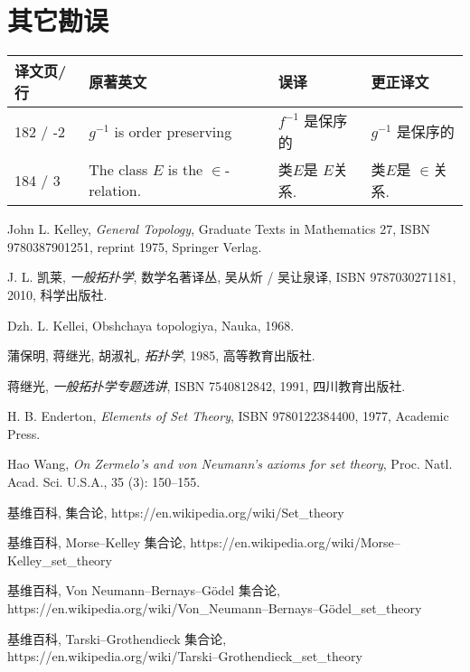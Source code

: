 \documentclass[zihao=-4,a4paper]{ctexart}
\begin{document}
\section{其它勘误}

\begin{tabular}{l l l l }
	\hline
	{\kaishu 译文页/行} & {\kaishu 原著英文} & {\kaishu 误译} & {\kaishu 更正译文} \\
	\hline
	182 / -2 & $g^{-1}$ is order preserving  & $f^{-1}$ 是保序的 & $g^{-1}$ 是保序的 \\
	184 / 3 & The class $E$ is the $\in$-relation. &类$E$是 $E$关系. & 类$E$是 $\in$关系. \\
	\hline
\end{tabular}






\begin{thebibliography}{9}
John L. Kelley,  \emph{General Topology}, Graduate Texts in Mathematics 27, ISBN 9780387901251, reprint 1975, Springer Verlag.
	
J. L. 凯莱,  \emph{一般拓扑学}, 数学名著译丛, 吴从炘 / 吴让泉译, ISBN 9787030271181, 2010, 科学出版社.

{\selectfont  D{zh}. L. Kellei, Ob{shch}a{ya} topologi{ya}, Nauka,} 1968.


蒲保明, 蒋继光, 胡淑礼, \emph{拓扑学}, 1985, 高等教育出版社.

蒋继光, \emph{一般拓扑学专题选讲}, ISBN 7540812842, 1991, 四川教育出版社.
	
H. B. Enderton, \emph{Elements of Set Theory}, ISBN 9780122384400, 1977, Academic Press.
	
Hao Wang, \emph{On Zermelo's and von Neumann's axioms for set theory}, Proc. Natl. Acad. Sci. U.S.A., 35 (3): 150–155.

基维百科, 集合论,	https://en.wikipedia.org/wiki/Set\_theory

基维百科, Morse–Kelley 集合论,	https://en.wikipedia.org/wiki/Morse–Kelley\_set\_theory

基维百科, Von Neumann–Bernays–Gödel  集合论,\\ https://en.wikipedia.org/wiki/Von\_Neumann–Bernays–Gödel\_set\_theory

基维百科, Tarski–Grothendieck  集合论,\\
https://en.wikipedia.org/wiki/Tarski–Grothendieck\_set\_theory

\end{thebibliography}
\end{document}
